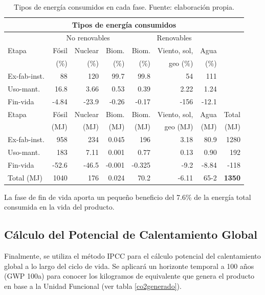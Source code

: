 \begin{table}[!htbp]
\centering
\begin{tabular}{p{2cm}rrrrrrr}
\toprule
\multicolumn{8}{c}{Tipos de energía consumidos}\\
\midrule
 & \multicolumn{3}{c}{No renovables} & \multicolumn{3}{c}{Renovables}\\
\midrule
Etapa & Fósil & Nuclear & Biom. & Biom. & Viento, sol,& Agua\\
 & (\%) & (\%) & (\%) & (\%) & geo (\%) & (\%)\\
\midrule
Ex-fab-inst. & 88 & 120 & 99.7 & 99.8 & 54 & 111\\
Uso-mant. & 16.8 & 3.66 & 0.53 & 0.39 & 2.22 & 1.24\\
Fin-vida & -4.84 & -23.9 & -0.26 & -0.17 & -156 & -12.1\\
\midrule
\midrule
Etapa & Fósil & Nuclear & Biom. & Biom. & Viento, sol,& Agua & Total\\
& (\si{MJ}) & (\si{MJ}) & (\si{MJ}) & (\si{MJ}) & geo (\si{MJ}) & (\si{MJ}) & (\si{MJ})\\
\midrule
Ex-fab-inst. & 958 & 234 & 0.045 & 196 & 3.18 & 80.9 & 1280\\
Uso-mant. & 183 & 7.11 & 0.001 & 0.77 & 0.13 & 0.90 & 192\\
Fin-vida & -52.6 & -46.5 & -0.001 & -0.325 & -9.2 & -8.84 & -118\\
\midrule
Total (\si{MJ}) & 1040 & 176 & 0.024 & 70.2 & -6.11 & 65-2 & \textbf{1350}\\
\bottomrule
\end{tabular}
\caption[Tipos de energía consumidos en cada fase.]{Tipos de energía consumidos en cada fase. Fuente: elaboración propia.}
\label{tiposenergiaced}
\end{table}

La fase de fin de vida aporta un pequeño beneficio del 7.6\% de la energía total consumida en la vida del producto.

\subsection{Cálculo del Potencial de Calentamiento Global}
Finalmente, se utiliza el método IPCC para el cálculo potencial del calentamiento global a lo largo del ciclo de vida. Se aplicará un horizonte temporal a 100 años (GWP 100a) para conocer los kilogramos de  equivalente que genera el producto en base a la Unidad Funcional (ver tabla \ref{co2generado}).

